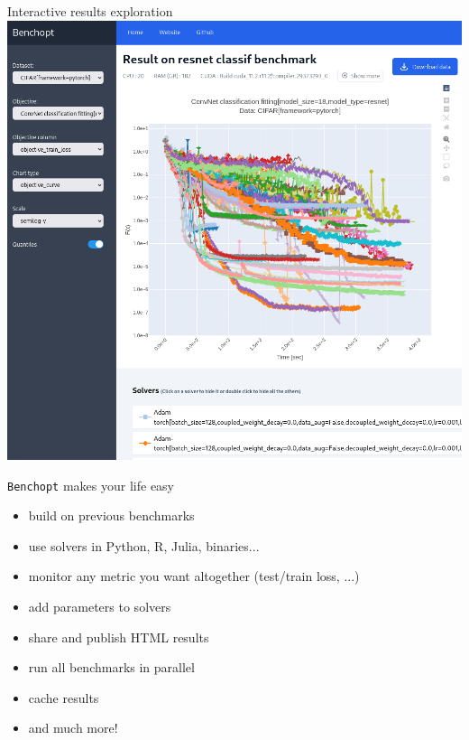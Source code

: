 \documentclass[unknownkeysallowed]{beamer}
\newcommand{\Benchopt}{\texttt{Benchopt}}
\begin{document}
\begin{frame}{Interactive results exploration}
    \centering
    \includegraphics[width=0.8\linewidth]{../sharedimages/benchopt_convnet.png}
\end{frame}


\begin{frame}{\Benchopt{} makes your life easy}

    \begin{itemize}
        \item build on previous benchmarks
        \item use solvers in Python, R, Julia, binaries...
        \item monitor any metric you want altogether (test/train loss, ...)
        \item add parameters to solvers
        \item share and publish HTML results
        \item run all benchmarks in parallel
        \item cache results
        \item and much more!
    \end{itemize}
\end{frame}
\end{document}
